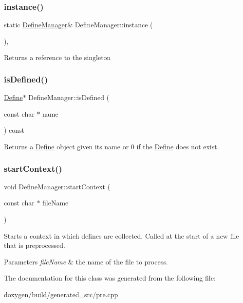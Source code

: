 \subsubsection{\texorpdfstring{instance()}{instance()}}
{\footnotesize\ttfamily static \mbox{\hyperlink{class_define_manager}{Define\+Manager}}\& Define\+Manager\+::instance (\begin{DoxyParamCaption}{ }\end{DoxyParamCaption})\hspace{0.3cm}{\ttfamily [inline]}, {\ttfamily [static]}}

Returns a reference to the singleton \mbox{\label{class_define_manager_adcbecf8890431621db6eacc7f6ac8b3d}} 
\subsubsection{\texorpdfstring{isDefined()}{isDefined()}}
{\footnotesize\ttfamily \mbox{\hyperlink{class_define}{Define}}$\ast$ Define\+Manager\+::is\+Defined (\begin{DoxyParamCaption}\item[{const char $\ast$}]{name }\end{DoxyParamCaption}) const\hspace{0.3cm}{\ttfamily [inline]}}

Returns a \mbox{\hyperlink{class_define}{Define}} object given its name or 0 if the \mbox{\hyperlink{class_define}{Define}} does not exist. \mbox{\label{class_define_manager_afbecee8baeba40d35a068f7f3e53fe3e}} 
\subsubsection{\texorpdfstring{startContext()}{startContext()}}
{\footnotesize\ttfamily void Define\+Manager\+::start\+Context (\begin{DoxyParamCaption}\item[{const char $\ast$}]{file\+Name }\end{DoxyParamCaption})\hspace{0.3cm}{\ttfamily [inline]}}

Starts a context in which defines are collected. Called at the start of a new file that is preprocessed. 
\begin{DoxyParams}{Parameters}
{\em file\+Name} & the name of the file to process. \\
\hline
\end{DoxyParams}


The documentation for this class was generated from the following file\+:\begin{DoxyCompactItemize}
\item 
doxygen/build/generated\+\_\+src/pre.\+cpp\end{DoxyCompactItemize}
